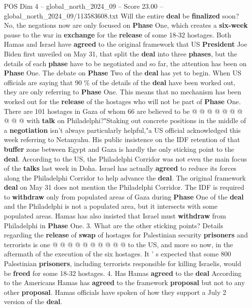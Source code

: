 \begin{textsample}{POS Dim 4 – global\_north\_2024\_09 – Score 23.00 – global\_north\_2024\_09/113583608.txt}
Will the entire \textbf{deal} be \textbf{finalized} soon?
No, the negations now are only focused on \textbf{Phase} One, which creates a \textbf{six-week} pause to the war in \textbf{exchange} for the \textbf{release} of some 18-32 hostages.
Both Hamas and Israel have \textbf{agreed} to the original framework that US \textbf{President} Joe Biden first unveiled on May 31, that split the \textbf{deal} into three \textbf{phases}, but the details of each \textbf{phase} have to be negotiated and so far, the attention has been on \textbf{Phase} One.
The debate on \textbf{Phase} Two of the \textbf{deal} has yet to begin.
When US officials are saying that 90 \% of the details of the \textbf{deal} have been worked out, they are only referring to \textbf{Phase} One.
This means that no mechanism has been worked out for the \textbf{release} of the hostages who will not be part of \textbf{Phase} One.
There are 101 hostages in Gaza of whom 66 are believed to be @ @ @ @ @ @ @ @ @ @ with \textbf{talk} on Philadelphi?"Staking out concrete positions in the middle of a \textbf{negotiation} isn't always particularly helpful,"a US official acknowledged this week referring to Netanyahu.
His public insistence on the IDF retention of that \textbf{buffer} zone between Egypt and Gaza is hardly the only sticking point to the \textbf{deal}.
According to the US, the Philadelphi Corridor was not even the main focus of the \textbf{talks} last week in Doha.
Israel has actually \textbf{agreed} to reduce its forces along the Philadelphi Corridor to help advance the \textbf{deal}.
The original framework \textbf{deal} on May 31 does not mention the Philadelphi Corridor.
The IDF is required to \textbf{withdraw} only from populated areas of Gaza during \textbf{Phase} One of the \textbf{deal} and the Philadelphi is not a populated area, but it intersects with some populated areas.
Hamas has also insisted that Israel must \textbf{withdraw} from Philadelphi in \textbf{Phase} One. 3.
What are the other sticking points?
Details regarding the \textbf{release} of \textbf{swap} of hostages for Palestinian security \textbf{prisoners} and terrorists is one @ @ @ @ @ @ @ @ @ @ to the US, and more so now, in the aftermath of the execution of the six hostages.
It ' s expected that some 800 Palestinian \textbf{prisoners}, including terrorists responsible for killing Israelis, would be \textbf{freed} for some 18-32 hostages. 4.
Has Hamas \textbf{agreed} to the \textbf{deal} According to the Americans Hamas has \textbf{agreed} to the framework \textbf{proposal} but not to any other \textbf{proposal}.
Hamas officials have spoken of how they support a July 2 version of the \textbf{deal}.

\end{textsample}
